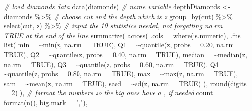 \documentclass[
]{article}
\newenvironment{Shaded}{\begin{snugshade}}{\end{snugshade}}
\newcommand{\AttributeTok}[1]{\textcolor[rgb]{0.77,0.63,0.00}{#1}}
\newcommand{\CommentTok}[1]{\textcolor[rgb]{0.56,0.35,0.01}{\textit{#1}}}
\newcommand{\ConstantTok}[1]{\textcolor[rgb]{0.00,0.00,0.00}{#1}}
\newcommand{\DecValTok}[1]{\textcolor[rgb]{0.00,0.00,0.81}{#1}}
\newcommand{\FloatTok}[1]{\textcolor[rgb]{0.00,0.00,0.81}{#1}}
\newcommand{\FunctionTok}[1]{\textcolor[rgb]{0.00,0.00,0.00}{#1}}
\newcommand{\NormalTok}[1]{#1}
\newcommand{\OtherTok}[1]{\textcolor[rgb]{0.56,0.35,0.01}{#1}}
\newcommand{\SpecialCharTok}[1]{\textcolor[rgb]{0.00,0.00,0.00}{#1}}
\newcommand{\StringTok}[1]{\textcolor[rgb]{0.31,0.60,0.02}{#1}}
\begin{document}
\begin{Shaded}
\begin{Highlighting}[]
\CommentTok{\# load diamonds data}
\FunctionTok{data}\NormalTok{(diamonds)}
\CommentTok{\# name variable}
\NormalTok{depthDiamonds }\OtherTok{\textless{}{-}}\NormalTok{ diamonds }\SpecialCharTok{\%\textgreater{}\%}
\CommentTok{\# choose cut and the depth which is z}
\FunctionTok{group\_by}\NormalTok{(cut) }\SpecialCharTok{\%\textgreater{}\%}
\FunctionTok{select}\NormalTok{(cut, z) }\SpecialCharTok{\%\textgreater{}\%}
\CommentTok{\# input the 10 statistics needed, not forgetting na.rm = TRUE at the end of the line}
\FunctionTok{summarize}\NormalTok{(}
\FunctionTok{across}\NormalTok{(}
\AttributeTok{.cols =} \FunctionTok{where}\NormalTok{(is.numeric),}
\AttributeTok{.fns =} \FunctionTok{list}\NormalTok{(}
\AttributeTok{min =} \SpecialCharTok{\textasciitilde{}}\FunctionTok{min}\NormalTok{(z, }\AttributeTok{na.rm =} \ConstantTok{TRUE}\NormalTok{),}
\AttributeTok{Q1 =} \SpecialCharTok{\textasciitilde{}}\FunctionTok{quantile}\NormalTok{(z, }\AttributeTok{probs =} \FloatTok{0.20}\NormalTok{, }\AttributeTok{na.rm =} \ConstantTok{TRUE}\NormalTok{),}
\AttributeTok{Q2 =} \SpecialCharTok{\textasciitilde{}}\FunctionTok{quantile}\NormalTok{(z, }\AttributeTok{probs =} \FloatTok{0.40}\NormalTok{, }\AttributeTok{na.rm =} \ConstantTok{TRUE}\NormalTok{),}
\AttributeTok{median =} \SpecialCharTok{\textasciitilde{}}\FunctionTok{median}\NormalTok{(z, }\AttributeTok{na.rm =} \ConstantTok{TRUE}\NormalTok{),}
\AttributeTok{Q3 =} \SpecialCharTok{\textasciitilde{}}\FunctionTok{quantile}\NormalTok{(z, }\AttributeTok{probs =} \FloatTok{0.60}\NormalTok{, }\AttributeTok{na.rm =} \ConstantTok{TRUE}\NormalTok{),}
\AttributeTok{Q4 =} \SpecialCharTok{\textasciitilde{}}\FunctionTok{quantile}\NormalTok{(z, }\AttributeTok{probs =} \FloatTok{0.80}\NormalTok{, }\AttributeTok{na.rm =} \ConstantTok{TRUE}\NormalTok{),}
\AttributeTok{max =} \SpecialCharTok{\textasciitilde{}}\FunctionTok{max}\NormalTok{(z, }\AttributeTok{na.rm =} \ConstantTok{TRUE}\NormalTok{),}
\AttributeTok{sam =} \SpecialCharTok{\textasciitilde{}}\FunctionTok{mean}\NormalTok{(z, }\AttributeTok{na.rm =} \ConstantTok{TRUE}\NormalTok{),}
\AttributeTok{sasd =} \SpecialCharTok{\textasciitilde{}}\FunctionTok{sd}\NormalTok{(z, }\AttributeTok{na.rm =} \ConstantTok{TRUE}\NormalTok{)}
\NormalTok{),}
\FunctionTok{round}\NormalTok{(}\AttributeTok{digits =} \DecValTok{2}\NormalTok{)}
\NormalTok{),}
\CommentTok{\# format the numbers so the big ones have a , if needed}
\AttributeTok{count =} \FunctionTok{format}\NormalTok{(}\FunctionTok{n}\NormalTok{(), }\AttributeTok{big.mark =} \StringTok{","}\NormalTok{),}

\end{Highlighting}
\end{Shaded}
\end{document}
